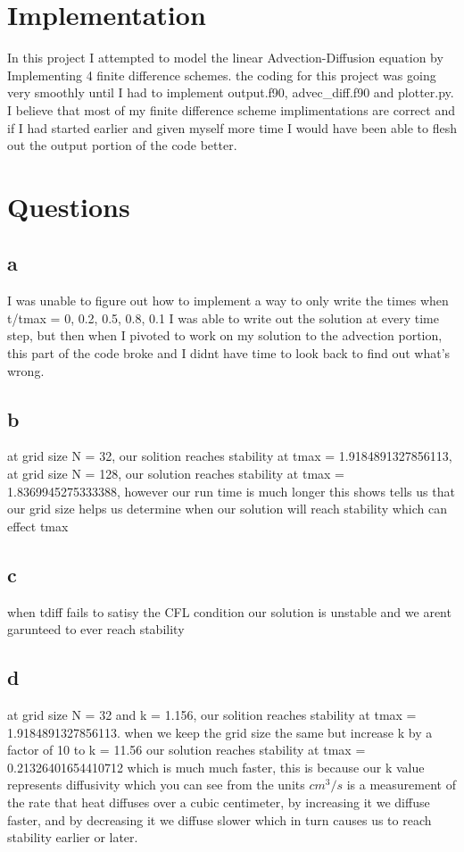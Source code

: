 \documentclass{article}
\begin{document}
\section*{Implementation}
In this project I attempted to model the linear Advection-Diffusion equation by Implementing 4 finite difference schemes. 
the coding for this project was going very smoothly until I had to implement output.f90, advec\_diff.f90 and plotter.py.
I believe that most of my finite difference scheme implimentations are correct and if I had started earlier and given myself 
more time I would have been able to flesh out the output portion of the code better. 

\section*{Questions}
\subsection*{a}
I was unable to figure out how to implement a way to only write the times when t/tmax = 0, 0.2, 0.5, 0.8, 0.1 I was able to write out the solution at every time step, 
but then when I pivoted to work on my solution to the advection portion, this part of the code broke and I didnt have time to look back to find out what's wrong.
\subsection*{b}
at grid size N = 32, our solition reaches stability at tmax = 1.9184891327856113, at grid size N = 128, our solution reaches stability at tmax = 1.8369945275333388, however our run time is much longer
this shows tells us that our grid size helps us determine when our solution will reach stability which can effect tmax
\subsection*{c}
when tdiff fails to satisy the CFL condition our solution is unstable and we arent garunteed to ever reach stability
\subsection*{d}
at grid size N = 32 and k = 1.156, our solition reaches stability at tmax = 1.9184891327856113. when we keep the grid size the same but increase k by a factor of 10 to 
k = 11.56 our solution reaches stability at tmax = 0.21326401654410712 which is much much faster, this is because our k value represents diffusivity which you can see from the 
units $cm^3/s$ is a measurement of the rate that heat diffuses over a cubic centimeter, by increasing it we diffuse faster, and by decreasing it we diffuse slower
which in turn causes us to reach stability earlier or later.
\end{document}
